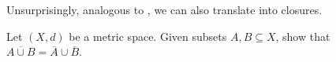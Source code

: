 \documentclass[../main.tex]{subfiles}
\begin{document}
Unsurprisingly, analogous to , we can also translate  into closures.
\begin{exe} \label{exe:union-cl}
    Let $(X,d)$ be a metric space. Given subsets $A,B\subseteq X$, show that $\overline{A\cup B}=\overline A\cup\overline B$.
\end{exe}
\end{document}
